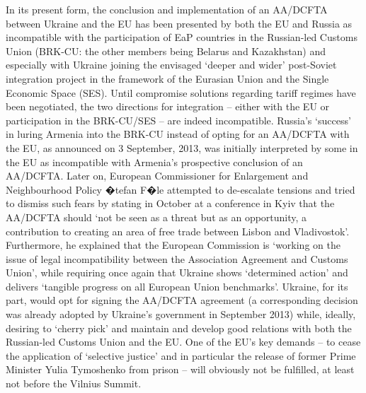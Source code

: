 In its present form, the conclusion and implementation of an AA/DCFTA between Ukraine and the EU has been presented by both the EU and Russia as incompatible with the participation of EaP countries in the Russian-led Customs Union (BRK-CU: the other members being Belarus and Kazakhstan) and especially with Ukraine joining the envisaged `deeper and wider' post-Soviet integration project in the framework of the Eurasian Union and the Single Economic Space (SES). Until compromise solutions regarding tariff regimes have been negotiated, the two directions for integration -- either with the EU or participation in the BRK-CU/SES -- are indeed incompatible. Russia's `success' in luring Armenia into the BRK-CU instead of opting for an AA/DCFTA with the EU, as announced on 3 September, 2013, was initially interpreted by some in the EU as incompatible with Armenia's prospective conclusion of an AA/DCFTA. Later on, European Commissioner for Enlargement and Neighbourhood Policy �tefan F�le attempted to de-escalate tensions and tried to dismiss such fears by stating in October at a conference in Kyiv that the AA/DCFTA should `not be seen as a threat but as an opportunity, a contribution to creating an area of free trade between Lisbon and Vladivostok'. Furthermore, he explained that the European Commission is `working on the issue of legal incompatibility between the Association Agreement and Customs Union', while requiring once again that Ukraine shows `determined action' and delivers `tangible progress on all European Union benchmarks'. Ukraine, for its part, would opt for signing the AA/DCFTA agreement (a corresponding decision was already adopted by Ukraine's government in September 2013) while, ideally, desiring to `cherry pick' and maintain and develop good relations with both the Russian-led Customs Union and the EU. One of the EU's key demands -- to cease the application of `selective justice' and in particular the release of former Prime Minister Yulia Tymoshenko from prison -- will obviously not be fulfilled, at least not before the Vilnius Summit.

